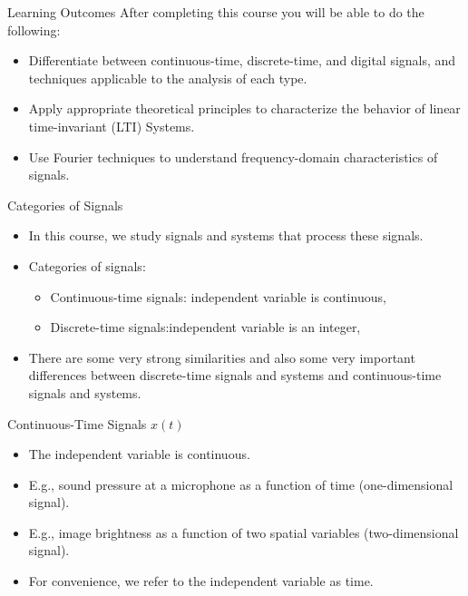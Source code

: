 \begin{frame}{Learning Outcomes}
    After completing this course you will be able to do the following:
    \begin{itemize}[<+->]
        \item Differentiate between continuous-time, discrete-time, and digital signals, and techniques applicable to the analysis of each type.
        \item Apply appropriate theoretical principles to characterize the behavior of linear time-invariant (LTI) Systems.
        \item Use Fourier techniques to understand frequency-domain characteristics of signals.
    \end{itemize}
\end{frame}


\begin{frame}{Categories of Signals}
    \begin{itemize}[<+->]
        \item In this course, we study signals and systems that process these signals.
        \item Categories of signals:
            \begin{itemize}
                \item Continuous-time signals: independent variable is continuous, 
                \item Discrete-time signals:independent variable is an integer,  
            \end{itemize}
        \item There are some very strong similarities and also some very important differences between discrete-time signals and systems and continuous-time signals and systems.
    \end{itemize}
\end{frame}


\begin{frame}{Continuous-Time Signals $x(t)$}
    \begin{itemize}
        \item The independent variable is continuous.
        \item E.g., sound pressure at a microphone as a function of time (one-dimensional signal).
        \item E.g., image brightness as a function of two spatial variables (two-dimensional signal).
        \item For convenience, we refer to the independent variable as time.
    \end{itemize}
\end{frame}

